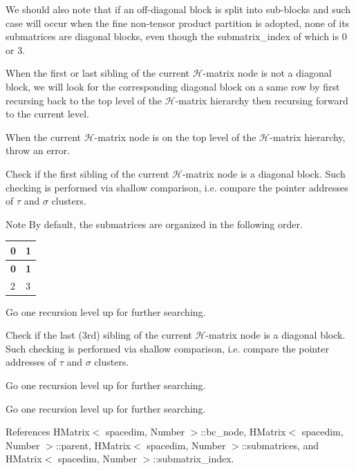 We should also note that if an off-\/diagonal block is split into sub-\/blocks and such case will occur when the fine non-\/tensor product partition is adopted, none of its submatrices are diagonal blocks, even though the {\ttfamily submatrix\+\_\+index} of which is 0 or 3.

When the first or last sibling of the current $\mathcal{H}$-\/matrix node is not a diagonal block, we will look for the corresponding diagonal block on a same row by first recursing back to the top level of the $\mathcal{H}$-\/matrix hierarchy then recursing forward to the current level.

When the current $\mathcal{H}$-\/matrix node is on the top level of the $\mathcal{H}$-\/matrix hierarchy, throw an error.

Check if the first sibling of the current $\mathcal{H}$-\/matrix node is a diagonal block. Such checking is performed via shallow comparison, i.\+e. compare the pointer addresses of $\tau$ and $\sigma$ clusters.


\begin{DoxyDescription}
\item[Note ]By default, the submatrices are organized in the following order. {\ttfamily  \tabulinesep=1mm
\begin{longtabu} spread 0pt [c]{*{2}{|X[-1]}|}
\hline
\rowcolor{\tableheadbgcolor}\textbf{ 0 }&\textbf{ 1  }\\
\endfirsthead
\hline
\endfoot
\hline
\rowcolor{\tableheadbgcolor}\textbf{ 0 }&\textbf{ 1  }\\
 &3 \\
\end{longtabu}
} 
\end{DoxyDescription}

Go one recursion level up for further searching.

Check if the last (3rd) sibling of the current $\mathcal{H}$-\/matrix node is a diagonal block. Such checking is performed via shallow comparison, i.\+e. compare the pointer addresses of $\tau$ and $\sigma$ clusters.

Go one recursion level up for further searching.

Go one recursion level up for further searching.

References H\+Matrix$<$ spacedim, Number $>$\+::bc\+\_\+node, H\+Matrix$<$ spacedim, Number $>$\+::parent, H\+Matrix$<$ spacedim, Number $>$\+::submatrices, and H\+Matrix$<$ spacedim, Number $>$\+::submatrix\+\_\+index.




